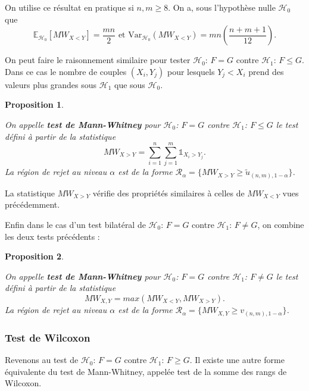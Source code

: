 \documentclass[
]{book}
\newtheorem{proposition}{Proposition}[chapter]
\theoremstyle{definition}
\theoremstyle{definition}
\theoremstyle{definition}
\theoremstyle{definition}
\theoremstyle{remark}
\begin{document}
On utilise ce résultat en pratique si \(n, m \geq 8\). On a, sous l'hypothèse nulle \(\mathcal{H}_0\) que
\[\mathbb{E}_{\mathcal{H}_0}[MW_{X <Y}]= \frac{mn}{2} \textrm{ et }
\mbox{Var}_{\mathcal{H}_0}(MW_{X < Y})= mn \left(\frac{n+m+1}{12}\right).\]

On peut faire le raisonnement similaire pour tester \(\mathcal{H}_0\): \(F=G\) contre \(\mathcal{H}_1\): \(F \leq G\). Dans ce cas le nombre de couples \((X_i, Y_j)\) pour lesquels \(Y_j < X_i\) prend des valeurs plus grandes sous \(\mathcal{H}_1\) que sous \(\mathcal{H}_0\).

\begin{proposition}
\protect\hypertarget{prp:unlabeled-div-31}{}\label{prp:unlabeled-div-31}

On appelle \textbf{test de Mann-Whitney} pour \(\mathcal{H}_0\): \(F=G\) contre \(\mathcal{H}_1\): \(F \leq G\) le test défini à partir de la statistique
\[ 
MW_{X>Y} = \sum_{i=1}^n \sum_{j=1}^m \mathbb{1}_{X_i >Y_j}.
\]
La région de rejet au niveau \(\alpha\) est de la forme \(\mathcal R_{\alpha} = \{MW_{X>Y}\geq \tilde u_{(n,m),1-\alpha} \}\).

\end{proposition}

La statistique \(MW_{X>Y}\) vérifie des propriétés similaires à celles de \(MW_{X<Y}\) vues précédemment.

Enfin dans le cas d'un test bilatéral de \(\mathcal{H}_0\): \(F=G\) contre \(\mathcal{H}_1\): \(F \neq G\), on combine les deux tests précédents :

\begin{proposition}
\protect\hypertarget{prp:unlabeled-div-32}{}\label{prp:unlabeled-div-32}

On appelle \textbf{test de Mann-Whitney} pour \(\mathcal{H}_0\): \(F=G\) contre \(\mathcal{H}_1\): \(F \neq G\) le test défini à partir de la statistique
\[ 
MW_{X,Y} = max(MW_{X<Y},MW_{X>Y}).
\]
La région de rejet au niveau \(\alpha\) est de la forme \(\mathcal R_{\alpha} = \{MW_{X,Y}\geq v_{(n,m),1-\alpha} \}\).

\end{proposition}

\hypertarget{test-de-wilcoxon}{%
\subsubsection{Test de Wilcoxon}\label{test-de-wilcoxon}}

Revenons au test de \(\mathcal{H}_0\): \(F=G\) contre \(\mathcal{H}_1\): \(F \geq G\). Il existe une autre forme équivalente du test de Mann-Whitney, appelée test de la somme des rangs de Wilcoxon.
\end{document}
